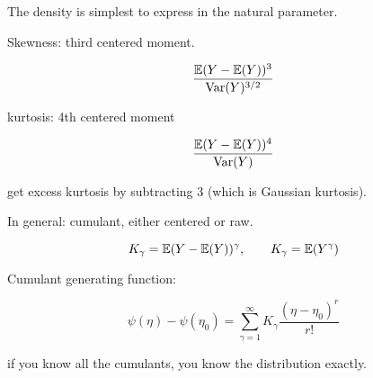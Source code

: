 The density is simplest to express in the natural parameter. 

Skewness: third centered moment. 

\[
\frac{\mathbb{E}(Y - \mathbb{E}(Y))^3}{\mathrm{Var}(Y)^{3/2}}
\]

kurtosis: 4th centered moment

\[
\frac{\mathbb{E}(Y - \mathbb{E}(Y))^4}{\mathrm{Var}(Y)}
\]

get excess kurtosis by subtracting 3 (which is Gaussian kurtosis).

In general: cumulant, either centered or raw.

\[
K_\gamma = \mathbb{E}(Y - \mathbb{E}(Y))^\gamma, \qquad K_\gamma = \mathbb{E}(Y^\gamma)
\]

Cumulant generating function:

\[
\psi(\eta) - \psi(\eta_0) = \sum_{\gamma=1}^\infty K_\gamma \frac{(\eta - \eta_0)^r}{r!} 
\]

if you know all the cumulants, you know the distribution exactly.

